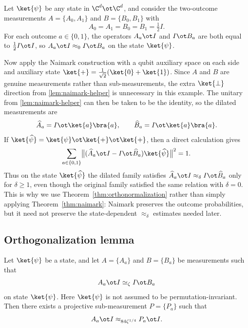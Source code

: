 \begin{remark}\label{ex:easy-but-long}
		Let $\ket{\psi}$ be any state in $\C^d \ot \C^d$, and consider the two-outcome measurements $A = \{A_0, A_1\}$ and $B = \{B_0, B_1\}$ with
		\[
			A_0 = A_1 = B_0 = B_1 = \tfrac{1}{2} I.
		\]
		For each outcome $a \in \{0,1\}$, the operators $A_a \ot I$ and $I \ot B_a$ are both equal to $\tfrac{1}{2} I \ot I$, so $A_a \ot I \approx_0 I \ot B_a$ on the state $\ket{\psi}$.

		Now apply the Naimark construction with a qubit auxiliary space on each side and auxiliary state $\ket{+} = \tfrac{1}{\sqrt 2}(\ket{0}+\ket{1})$. Since $A$ and $B$ are genuine measurements rather than sub-measurements, the extra $\ket{\bot}$ direction from \ref{lem:naimark-helper} is unnecessary in this example. The unitary from \ref{lem:naimark-helper} can then be taken to be the identity, so the dilated measurements are
		\[
			\widehat A_a = I \ot \ket{a}\bra{a}, \qquad \widehat B_a = I \ot \ket{a}\bra{a}.
		\]
		If $\ket{\widehat{\psi}} = \ket{\psi} \ot \ket{+} \ot \ket{+}$, then a direct calculation gives
		\[
			\sum_{a \in \{0,1\}} \bigl\lVert (\widehat A_a \ot I - I \ot \widehat B_a) \ket{\widehat{\psi}} \bigr\rVert^2 = 1.
		\]
		Thus on the state $\ket{\widehat{\psi}}$ the dilated family satisfies $\widehat A_a \ot I \approx_\delta I \ot \widehat B_a$ only for $\delta \ge 1$, even though the original family satisfied the same relation with $\delta = 0$. This is why we use Theorem~\ref{thm:orthonormalization} rather than simply applying Theorem~\ref{thm:naimark}: Naimark preserves the outcome probabilities, but it need not preserve the state-dependent $\approx_\delta$ estimates needed later.
\end{remark}

\subsection{Orthogonalization lemma}\label{sec:orthogonalization}

\begin{lemma}\label{lem:orthonormalization-main-lemma}
	\leanok
	Let $\ket{\psi}$ be a state, and let $A = \{A_a\}$ and $B = \{B_a\}$ be measurements such that
	\[
		A_a \ot I \simeq_\zeta I \ot B_a
	\]
	on state $\ket{\psi}$. Here $\ket{\psi}$ is not assumed to be permutation-invariant.
	Then there exists a projective sub-measurement $P = \{P_a\}$ such that
	\[
		A_a \ot I \approx_{84 \zeta^{1/4}} P_a \ot I.
	\]
\end{lemma}

